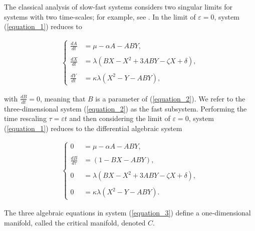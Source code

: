 \documentclass{ws-ijbc}
\begin{document}
The classical analysis of slow-fast systems considers two singular limits for systems with two time-scales; for example, see \cite{MMO}.  In the limit of $\varepsilon = 0$, system (\ref{equation_1}) reduces to
    
\begin{equation}
\begin{aligned}
\begin{cases}
\frac{dA}{dt} &= \mu - \alpha A - ABY, \\ \\
\frac{dX}{dt} &= \lambda(BX - X^2 +3ABY - \zeta X + \delta), \\ \\
\frac{dY}{dt} &= \kappa \lambda(X^2 - Y - ABY),
\end{cases}
\end{aligned}
\label{equation_2}
\end{equation}
    
\noindent
with $\frac{dB}{dt}=0$, meaning that $B$ is a parameter of (\ref{equation_2}).  We refer to the three-dimensional system (\ref{equation_2}) as the fast subsystem.  Performing the time rescaling $\tau = \varepsilon t$ and then considering the limit of $\varepsilon = 0$, system (\ref{equation_1}) reduces to the differential algebraic system
    
 \begin{equation}
\begin{aligned}
\begin{cases}
0 &= \mu - \alpha A - ABY, \\ \\
\frac{dB}{d\tau} &= (1-BX - ABY), \\ \\
0 &= \lambda (BX - X^2 +3ABY - \zeta X + \delta), \\ \\
0 &= \kappa \lambda(X^2 - Y - ABY).
\end{cases}
\end{aligned}
\label{equation_3}
\end{equation}
    
\noindent
The three algebraic equations in system (\ref{equation_3}) define a one-dimensional manifold, called the critical manifold, denoted $C$.
\end{document}

